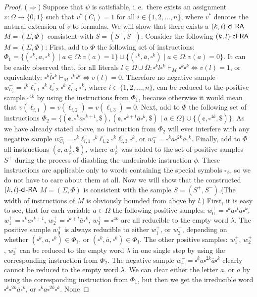 \begin{proof}
($\Rightarrow$)
Suppose that $\psi$ is satisfiable, i.\,e.\ there exists an assignment $v: \Omega \to \{0, 1\}$ such that $v^*(C_i) = 1$ for all $i \in \{1, 2, \ldots, n\}$, where $v^*$ denotes the natural extension of $v$ to formulas. We will show that there exists a $\textup{\sf $(k,l)$-\textup{\sf cl-RA\/}}$ $M = (\Sigma, \Phi)$ consistent with $S = (S^+, S^-)$. Consider the following $\textup{\sf $(k,l)$-\textup{\sf cl-RA\/}}$ $M = (\Sigma, \Phi)$: First, add to $\Phi$ the following set of instructions: $\Phi_1 = \{ (\square^k, a, \square^k) \mid a \in \Omega: v(a) = 1 \} \cup \{ (\square^k, \overline{a}, \square^k) \mid a \in \Omega: v(a) = 0 \}$. It can be easily observed that, for all literals $l \in \Omega \cup \overline{\Omega}: \square^k l \square^k \vdash_M \square^k \square^k \Leftrightarrow v(l) = 1$, or equivalently: $\square^k \overline{l} \square^k \vdash_M \square^k \square^k \Leftrightarrow v(l) = 0$. Therefore no negative sample $w_{C_i}^- = \square^k \overline{\ell_{i,1}} \square^k \overline{\ell_{i,2}} \square^k \overline{\ell_{i,3}} \square^k$, where $i \in \{1, 2, \ldots, n\}$, can be reduced to the positive sample $\square^{4k}$ by using the instructions from $\Phi_1$, because otherwise it would mean that $v(\ell_{i,1}) = v(\ell_{i,2}) = v(\ell_{i,3}) = 0$. Next, add to $\Phi$ the following set of instructions $\Phi_2 = \{ (\cent, \square^k a \square^{k+t}, \$), (\cent, \square^{k+t} \overline{a} \square^k, \$) \mid a \in \Omega \} \cup \{ (\cent, \square^{4k}, \$) \}$. As we have already stated above, no instruction from $\Phi_2$ will ever interfere with any negative sample $w_{C_i}^- = \square^k \overline{\ell_{i,1}} \square^k \overline{\ell_{i,2}} \square^k \overline{\ell_{i,3}} \square^k$, or $w_4^- = \square^k a \square^{2k}  \overline{a} \square^k$. Finally, add to $\Phi$ all instructions $(\cent,  w_{\phi}^+, \$)$, where $ w_{\phi}^+$ was added to the set of positive samples $S^+$ during the process of disabling the undesirable instruction $\phi$. These instructions are applicable only to words containing the special symbols $\square_{\phi}$, so we do not have to care about them at all. Now we will show that the constructed $\textup{\sf $(k,l)$-\textup{\sf cl-RA\/}}$ $M = (\Sigma, \Phi)$ is consistent with the sample $S = (S^+, S^-)$.(The width of instructions of $M$ is obviously bounded from above by $l$.) First, it is easy to see, that for each variable $a \in \Omega$ the following positive samples: $w_0^+ = \square^k a \square^t \overline{a} \square^k$, $w_1^+ = \square^k a \square^{k+t}$, $w_2^+ = \square^{k+t} \overline{a} \square^k$, $w_3^+ = \square^{4k}$ are all reducible to the empty word $\lambda$. The positive sample $w_0^+$ is always reducible to either $w_1^+$, or $w_2^+$, depending on whether $(\square^k, a, \square^k) \in \Phi_1$, or $(\square^k, \overline{a}, \square^k) \in \Phi_1$. The other positive samples: $w_1^+$, $w_2^+$, $w_3^+$ can be reduced to the empty word $\lambda$ in one single step by using the corresponding instruction from $\Phi_2$. The negative sample $w_4^- = \square^k a \square^{2k} \overline{a} \square^k$ clearly cannot be reduced to the empty word $\lambda$. We can clear either the letter $a$, or $\overline{a}$ by using the corresponding instruction from $\Phi_1$, but then we get the irreducible word $\square^k \square^{2k} \overline{a} \square^k$, or $\square^k a \square^{2k} \square^k$. None 
\end{proof}

